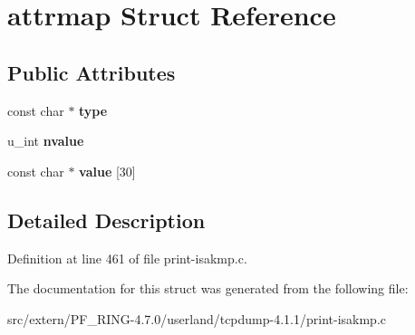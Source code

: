 \hypertarget{structattrmap}{
\section{attrmap Struct Reference}
\label{structattrmap}
}
\subsection*{Public Attributes}
\begin{DoxyCompactItemize}
\item 
\hypertarget{structattrmap_adcd9900fdcf01deac5707134b0dcc5bf}{
const char $\ast$ {\bfseries type}}
\label{structattrmap_adcd9900fdcf01deac5707134b0dcc5bf}

\item 
\hypertarget{structattrmap_a29b1753bdeebbb730d65990e6a099c3c}{
u\_\-int {\bfseries nvalue}}
\label{structattrmap_a29b1753bdeebbb730d65990e6a099c3c}

\item 
\hypertarget{structattrmap_aa0492319273f71c7213ef34e62dfc4bf}{
const char $\ast$ {\bfseries value} \mbox{[}30\mbox{]}}
\label{structattrmap_aa0492319273f71c7213ef34e62dfc4bf}

\end{DoxyCompactItemize}


\subsection{Detailed Description}


Definition at line 461 of file print-\/isakmp.c.



The documentation for this struct was generated from the following file:\begin{DoxyCompactItemize}
\item 
src/extern/PF\_\-RING-\/4.7.0/userland/tcpdump-\/4.1.1/print-\/isakmp.c\end{DoxyCompactItemize}

